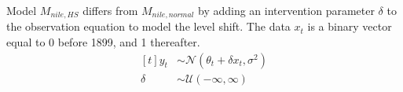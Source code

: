 \documentclass{article}
\newcommand{\dist}[1]{\mathcal{#1}}
\newcommand{\paren}[1]{\ensuremath{\left(#1\right)}}
\newcommand{\dnorm}[1]{\ensuremath{\dist{N}\paren{#1}}}
\newcommand{\dunif}[1]{\ensuremath{\dist{U}\paren{#1}}}
\begin{document}
Model $M_{nile,HS}$ differs from $M_{nile,normal}$ by adding an intervention parameter $\delta$ to the observation equation to model the level shift. 
The data $x_{t}$ is a binary vector equal to 0 before 1899, and 1 thereafter.
\begin{equation}
  \label{eq:19}
  \begin{aligned}[t]
    y_{t} &\sim \dnorm{\theta_{t} + \delta x_{t}, \sigma^{2}} \\
    \delta &\sim \dunif{-\infty, \infty}
  \end{aligned}
\end{equation}

\clearpage{}

\printbibliography{}
\end{document}
